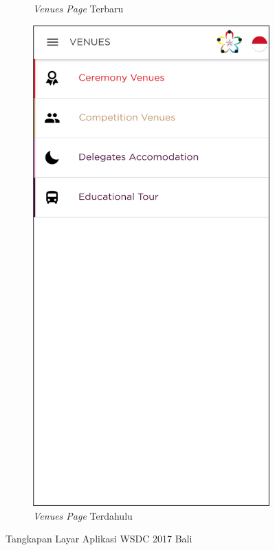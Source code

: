 \begin{figure}[H]
\begin{subfigure}[b]{0.3\textwidth}
         \caption{\textit{Venues Page} Terbaru}
         \label{fig:ssVenue}
     \end{subfigure}
     \hspace*{0.5in}
     \begin{subfigure}[b]{0.3\textwidth}
         \centering
         \includegraphics[width=\textwidth]{Gambar/VenuePage.png}
         \caption{\textit{Venues Page} Terdahulu}
         \label{fig:ssVenueOld}
     \end{subfigure}
        \caption{Tangkapan Layar Aplikasi WSDC 2017 Bali}
        \label{fig:ssApk1}
\end{figure}

